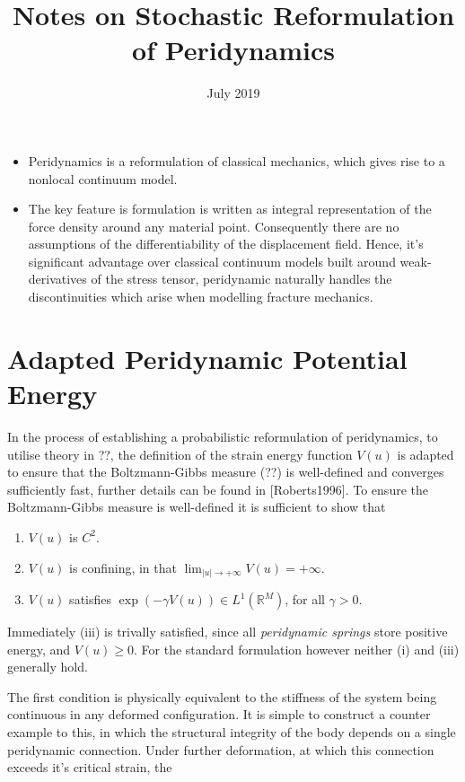 \documentclass{article}
\title{Notes on Stochastic Reformulation of Peridynamics}
\author{}
\date{July 2019}
\begin{document}
\maketitle

\begin{itemize}

\item Peridynamics is a reformulation of classical mechanics, which gives rise to a nonlocal continuum model.

\item The key feature is formulation is written as integral representation of the force density around any material point. Consequently there are no assumptions of the differentiability of the displacement field. Hence, it's significant advantage over classical continuum models built around weak-derivatives of the stress tensor, peridynamic naturally handles the discontinuities which arise when modelling fracture mechanics.

\end{itemize}

\section{Adapted Peridynamic Potential Energy}

In the process of establishing a probabilistic reformulation of peridynamics, to utilise theory in ??, the definition of the strain energy function $V(u)$ is adapted to ensure that the Boltzmann-Gibbs measure (??) is well-defined and converges sufficiently fast, further details can be found in [Roberts1996]. To ensure the Boltzmann-Gibbs measure is well-defined it is sufficient to show that
\begin{enumerate}
\item $V(u)$ is $C^2$.
\item $V(u)$ is confining, in that $\lim_{|u| \rightarrow +\infty} V(u) = +\infty$.
\item $V(u)$ satisfies $\exp(-\gamma V(u)) \in L^1(\mathbb R^M)$, for all $\gamma > 0$.
\end{enumerate}
Immediately (iii) is trivally satisfied, since all {\em peridynamic springs} store positive energy, and $V(u) \geq 0$. For the standard formulation however neither (i) and (iii) generally hold.

The first condition is physically equivalent to the stiffness of the system being continuous in any deformed configuration. It is simple to construct a counter example to this, in which the structural integrity of the body depends on a single peridynamic connection. Under further deformation, at which this connection exceeds it's critical strain, the 
\end{document}
